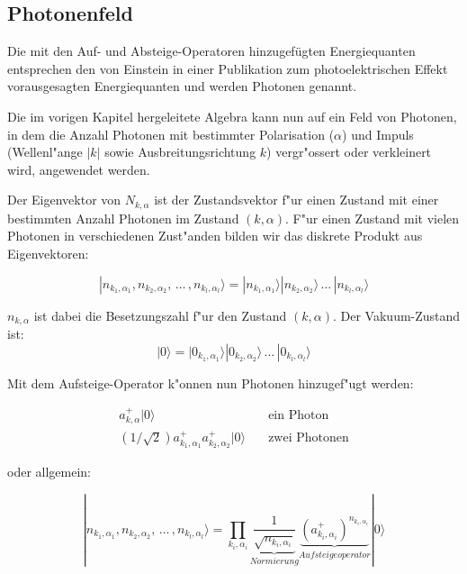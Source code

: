\subsection{Photonenfeld}

Die mit den Auf- und Absteige-Operatoren hinzugefügten Energiequanten entsprechen den von Einstein in einer Publikation zum photoelektrischen Effekt vorausgesagten Energiequanten und werden Photonen genannt.

Die im vorigen Kapitel hergeleitete Algebra kann nun auf ein Feld von Photonen, in dem die Anzahl Photonen mit bestimmter Polarisation ($\alpha$) und Impuls (Wellenl"ange $|k|$ sowie Ausbreitungsrichtung $k$) vergr"ossert oder verkleinert wird, angewendet werden.

Der Eigenvektor von $N_{k,\alpha}$ ist der Zustandsvektor f"ur einen Zustand mit einer bestimmten Anzahl Photonen im Zustand $(k,\alpha)$. F"ur einen Zustand mit vielen Photonen in verschiedenen Zust"anden bilden wir das diskrete Produkt aus Eigenvektoren:

\begin{equation*}
|n_{k_1,\alpha_1}, n_{k_2,\alpha_2}, \, \hdots \, , n_{k_l,\alpha_l}\rangle = |n_{k_1,\alpha_1}\rangle |n_{k_2,\alpha_2}\rangle \, \hdots \, |n_{k_l,\alpha_l}\rangle
\end{equation*}

$n_{k,\alpha}$ ist dabei die Besetzungszahl f"ur den Zustand $(k,\alpha)$. Der Vakuum-Zustand ist:
\begin{equation*}
|0\rangle = |0_{k_1,\alpha_1}\rangle |0_{k_2,\alpha_2}\rangle \, \hdots \, |0_{k_l,\alpha_l}\rangle
\end{equation*}

Mit dem Aufsteige-Operator k"onnen nun Photonen hinzugef"ugt werden:

\begin{align*}
a^+_{k,\alpha}|0\rangle & \quad \text{ein Photon}\\
\left(1/\sqrt{2}\right)a^+_{k_1,\alpha_1}a^+_{k_2,\alpha_2}|0\rangle & \quad \text{zwei Photonen}
\end{align*}

oder allgemein:

\begin{equation*}
|n_{k_1,\alpha_1}, n_{k_2,\alpha_2}, \, \hdots \, , n_{k_l,\alpha_l}\rangle =
 \prod_{k_i,\alpha_i}\underbrace{\frac{1}{\sqrt{n_{k_i,\alpha_i}}}}_{Normierung} \underbrace{\left(a^+_{k_i,\alpha_i}\right)^{n_{k_i,\alpha_i}}}_{Aufsteigeoperator} |0\rangle
\end{equation*}

